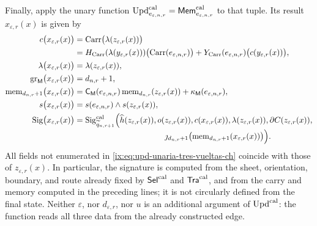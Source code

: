 Finally, apply the unary function
\(\operatorname{Upd}^{\rm cal}_{e_{\varepsilon,n,r}}
=\mathsf{Mem}^{\rm cal}_{e_{\varepsilon,n,r}}\) to that tuple. Its result
\(x_{\varepsilon,r}(x)\) is given by
\begin{equation}
\begin{aligned}
 c\bigl(x_{\varepsilon,r}(x)\bigr)
   &=\operatorname{Carr}\bigl(\lambda(z_{\varepsilon,r}(x))\bigr)\\
   &=H_{\rm Carr}(\lambda(y_{\varepsilon,r}(x)))
       \bigl(\operatorname{Carr}(e_{\varepsilon,n,r})\bigr)
     +Y_{\rm Carr}(e_{\varepsilon,n,r})
       \bigl(c(y_{\varepsilon,r}(x))\bigr),\\
 \lambda\bigl(x_{\varepsilon,r}(x)\bigr)
   &=\lambda(z_{\varepsilon,r}(x)),\\
 \operatorname{gr}_{\mathsf M}
      \bigl(x_{\varepsilon,r}(x)\bigr)
   &=d_{n,r}+1,\\
 \operatorname{mem}_{d_{n,r}+1}
       \bigl(x_{\varepsilon,r}(x)\bigr)
   &=\mathsf C_{\mathsf M}(e_{\varepsilon,n,r})
       \operatorname{mem}_{d_{n,r}}(z_{\varepsilon,r}(x))
     +\kappa_{\mathsf M}(e_{\varepsilon,n,r}),\\
 s\bigl(x_{\varepsilon,r}(x)\bigr)
   &=s(e_{\varepsilon,n,r})\wedge s(z_{\varepsilon,r}(x)),\\
 \operatorname{Sig}\bigl(x_{\varepsilon,r}(x)\bigr)
   &=\operatorname{Sig}^{\rm cal}_{\widetilde q_{n,r+1}}
       \Bigl(\widehat h(z_{\varepsilon,r}(x)),
             o(z_{\varepsilon,r}(x)),
             c(x_{\varepsilon,r}(x)),
             \lambda(z_{\varepsilon,r}(x)),
             \partial C(z_{\varepsilon,r}(x)),\\[-2pt]
   &\hspace{112pt}
             \jmath_{d_{n,r}+1}
              \bigl(\operatorname{mem}_{d_{n,r}+1}
                 (x_{\varepsilon,r}(x))\bigr)\Bigr).
\end{aligned}
\label{ix:eq:upd-unaria-tres-vueltas-ch}
\end{equation}
All fields not enumerated in \eqref{ix:eq:upd-unaria-tres-vueltas-ch} coincide
with those of \(z_{\varepsilon,r}(x)\). In particular, the signature is
computed from the sheet, orientation, boundary, and route already fixed by
\(\mathsf{Sel}^{\rm cal}\) and \(\mathsf{Tra}^{\rm cal}\), and from the carry
and memory computed in the preceding lines; it is not circularly defined from
the final state. Neither \(\varepsilon\), nor \(d_{\varepsilon,r}\), nor
\(u\) is an additional argument of \(\operatorname{Upd}^{\rm cal}\): the
function reads all three data from the already constructed edge.

